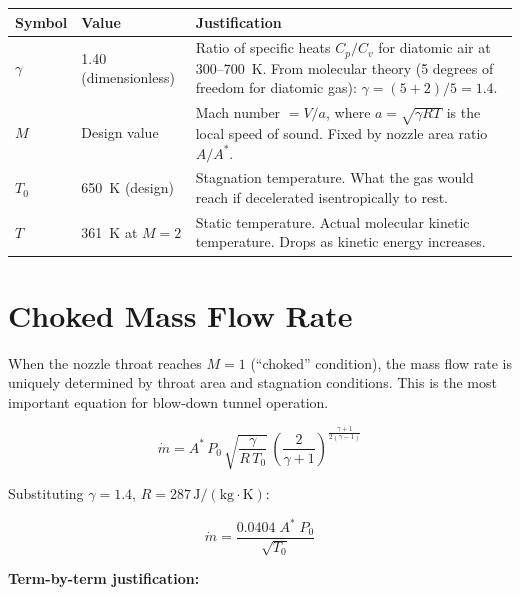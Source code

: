 \documentclass[12pt,a4paper]{report}
\begin{document}
\begin{center}
\renewcommand{\arraystretch}{1.4}
\begin{tabular}{@{}lll@{}}
  \toprule
  \textbf{Symbol} & \textbf{Value} & \textbf{Justification}\\
  \midrule
  $\gamma$ & 1.40 (dimensionless)
    & Ratio of specific heats $C_p/C_v$ for diatomic air at 300--700~K.
      From molecular theory (5 degrees of freedom for diatomic gas):
      $\gamma = (5+2)/5 = 1.4$.\\
  $M$ & Design value
    & Mach number $= V/a$, where $a = \sqrt{\gamma R T}$ is the local
      speed of sound. Fixed by nozzle area ratio $A/A^*$.\\
  $T_0$ & 650~K (design)
    & Stagnation temperature. What the gas would reach if
      decelerated isentropically to rest.\\
  $T$ & 361~K at $M=2$
    & Static temperature. Actual molecular kinetic temperature.
      Drops as kinetic energy increases.\\
  \bottomrule
\end{tabular}
\end{center}

\section{Choked Mass Flow Rate}

When the nozzle throat reaches $M=1$ (``choked'' condition), the mass flow
rate is uniquely determined by throat area and stagnation conditions. This is
the most important equation for blow-down tunnel operation.

\begin{formulabox}
\begin{equation}
  \dot{m} = A^*\, P_0\,
  \sqrt{\frac{\gamma}{R\,T_0}}\,
  \left(\frac{2}{\gamma+1}\right)^{\!\frac{\gamma+1}{2(\gamma-1)}}
  \label{eq:chokedlong}
\end{equation}
\end{formulabox}

Substituting $\gamma=1.4$, $R=287\,\mathrm{J/(kg \cdot K)}$:

\begin{formulabox}
\begin{equation}
  \boxed{\dot{m} = \frac{0.0404\; A^*\; P_0}{\sqrt{T_0}}}
  \label{eq:choked}
\end{equation}
\end{formulabox}

\medskip
\noindent\textbf{Term-by-term justification:}
\end{document}
